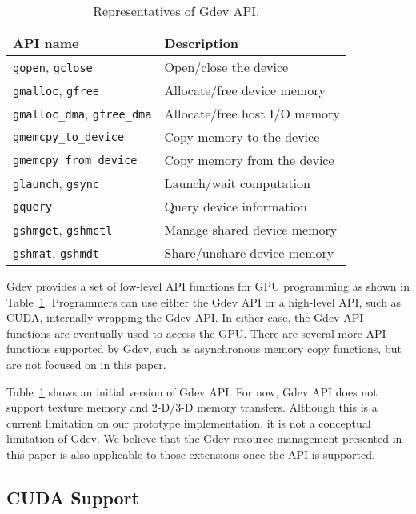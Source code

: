 \begin{table}[t]
 \caption{Representatives of Gdev API.}
 \label{tab:gdev_api}
 \begin{center}
  {\footnotesize
  \begin{tabular}{|l|l|}
   \hline
   \textbf{API name} & \textbf{Description}\\
   \hline
   \texttt{gopen}, \texttt{gclose} & Open/close the device\\
   \hline
   \texttt{gmalloc}, \texttt{gfree} & Allocate/free device memory\\
   \hline
   \texttt{gmalloc\_dma}, \texttt{gfree\_dma} & Allocate/free host I/O memory\\
   \hline
   \texttt{gmemcpy\_to\_device} & Copy memory to the device\\
   \hline
   \texttt{gmemcpy\_from\_device} & Copy memory from the device\\
   \hline
   \texttt{glaunch}, \texttt{gsync} & Launch/wait computation\\
   \hline
   \texttt{gquery} & Query device information\\
   \hline
   \texttt{gshmget}, \texttt{gshmctl} & Manage shared device memory\\
   \hline
   \texttt{gshmat}, \texttt{gshmdt} & Share/unshare device memory\\
   \hline
  \end{tabular}
  }
 \end{center}
\vspace{-1em}
\end{table}

Gdev provides a set of low-level API functions for GPU programming as
shown in Table~\ref{tab:gdev_api}.
Programmers can use either the Gdev API or a high-level API, such as
CUDA, internally wrapping the Gdev API.
In either case, the Gdev API functions are eventually used to access
the GPU.
There are several more API functions supported by Gdev, such as
asynchronous memory copy functions, but are not focused on in this
paper.

Table~\ref{tab:gdev_api} shows an initial version of Gdev API.
For now, Gdev API does not support texture memory and 2-D/3-D memory
transfers.
Although this is a current limitation on our prototype implementation,
it is not a conceptual limitation of Gdev.
We believe that the Gdev resource management presented in this paper is
also applicable to those extensions once the API is supported.

\subsection{CUDA Support}


